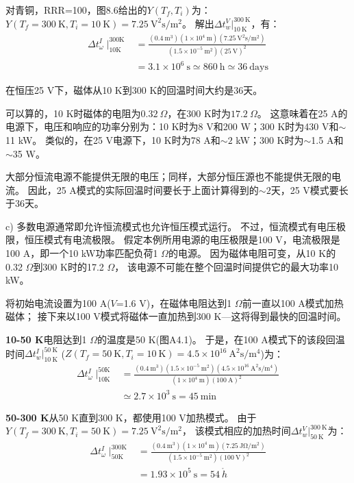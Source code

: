 对青铜，RRR=100，图8.6给出的$Y(T_f,T_i)$为：
$Y(T_f=300\ \mathrm{K},T_i=10\ \mathrm{K})=7.25\ \mathrm{V^2 s/m^2}$。
解出$\Delta t_w^V|_{10\ \mathrm{K}}^{300\ \mathrm{K}}$，有：
\begin{align*}%
\Delta t_{\omega}^{I}\mid_{10\mathrm{K}}^{300\mathrm{K}}&=\frac{(0.4\ \mathrm{m^3})(1\times 10^4\ \mathrm{m})(7.25\ \mathrm{V^2s/m^2})}{(1.5\times 10^{-5}\ \mathrm{m^2})(25\ \mathrm{V})^2} \\
&=3.1\times 10^6\ \mathrm{s}\simeq 860\ \mathrm{h}\simeq 36\ \mathrm{days} \tag{S1.4}
\end{align*}

在恒压25 V下，磁体从10 K到300 K的回温时间大约是36天。

可以算的，10 K时磁体的电阻为$0.32\ \Omega$，在300 K时为$17.2\ \Omega$。
这意味着在25 A的电源下，电压和响应的功率分别为：10 K时为8 V和200 W；300 K时为430 V和$\sim$11 kW。
类似的，在25 V电源下，10 K时为78 A和$\sim 2$ kW；300 K时为$\sim$1.5 A和$\sim$35 W。

大部分恒流电源不能提供无限的电压；同样，大部分恒压源也不能提供无限的电流。
因此，25 A模式的实际回温时间要长于上面计算得到的$\sim 2$天，25 V模式要长于36天。

c) 多数电源通常即允许恒流模式也允许恒压模式运行。
不过，恒流模式有电压极限，恒压模式有电流极限。
假定本例所用电源的电压极限是100 V，电流极限是100 A，即一个10 kW功率匹配负荷1 $\Omega$的电源。
因为磁体电阻可变，从10 K的0.32 $\Omega$到300 K时的17.2 $\Omega$，
该电源不可能在整个回温时间提供它的最大功率10 kW。

将初始电流设置为100 A($V$=1.6 V)，在磁体电阻达到1 $\Omega$前一直以100 A模式加热磁体；
接下来以100 V模式将磁体一直加热到300 K---这将得到最快的回温时间。

\textbf{10-50 K}\quad 电阻达到1 $\Omega$的温度是50 K(图A4.1)。
于是，在100 A模式下的该段回温时间$\Delta t_w^I|_{10\ \mathrm{K}}^{50\ \mathrm{K}}$
	($Z(T_f=50\ \mathrm{K},T_i=10\ \mathrm{K})=4.5\times 10^{16}\ \mathrm{A^2 s/m^4}$)为：
\begin{align*}%
\Delta t_{\omega}^{I}\mid_{10\mathrm{K}}^{50\mathrm{K}}&=\frac{(0.4\ \mathrm{m^3})(1.5\times 10^{-5}\ \mathrm{m^2})(4.5\times 10^{16}\ \mathrm{A^2s/m^4})}{(1\times 10^4\ \mathrm{m})(100\ \mathrm{A})^2} \\
&\simeq 2.7\times 10^3\ \mathrm{s}=45\ \mathrm{min} \tag{S1.5}
\end{align*}

\textbf{50-300 K}\quad 从50 K直到300 K，都使用100 V加热模式。
由于$Y(T_f=300\ \mathrm{K},T_i=50\ \mathrm{K})=7.25\ \mathrm{V^2 s/m^2}$，
该模式相应的加热时间$\Delta t_w^V|_{50\ \mathrm{K}}^{300\ \mathrm{K}}$为：
\begin{align*}%
\Delta t_{\omega}^{I}\mid_{50\mathrm{K}}^{300\mathrm{K}}&=\frac{(0.4\ \mathrm{m^3})(1\times 10^4\ \mathrm{m})(7.25\ \mathrm{J\Omega/m^2})}{(1.5\times 10^{-5}\ \mathrm{m^2})(100\ \mathrm{V})^2} \\
&=1.93\times 10^5\ \mathrm{s}=54\ \mathring{h} \tag{S1.6}
\end{align*}

